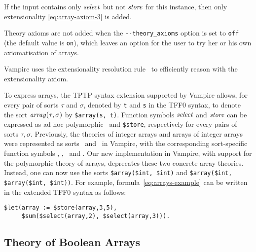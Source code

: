 If the input contains only $\mathit{select}$ but not $\mathit{store}$ for this instance, then only extensionality \eqref{eq:array-axiom-3} is added.

Theory axioms are not added when the \verb'--theory_axioms' option is set to \verb'off' (the default value is \verb'on'), which leaves an option for the user to try her or his own axiomatisation of arrays.

Vampire uses the extensionality resolution rule~\cite{ATVA14} to efficiently reason with the extensionality axiom.

To express arrays, the TPTP syntax extension supported by Vampire
allows, for every pair of sorts $\tau$ and $\sigma$, denoted by
\lstinline't' and \lstinline's' in the TFF0 syntax, to denote the sort
$\mathit{array}(\tau,\sigma)$ by \lstinline'$array(s, t)'. Function symbols $\mathit{select}$
and $\mathit{store}$ can be expressed as ad-hoc polymorphic \dselect\ and
\texttt{\$store}, respectively for every pairs of sorts
$\tau,\sigma$. Previously,
the theories of integer arrays and arrays of integer arrays were
represented as sorts \darrayone\ and \darraytwo\ in Vampire,
with the corresponding sort-specific function symbols \dselectone, \dselecttwo, \dstoreone\  and
\dstoretwo. Our new implementation in Vampire, with
support for the polymorphic theory of arrays, deprecates these
two concrete array theories. Instead, one can now use the sorts
\lstinline'$array($int, $int)' and \lstinline'$array($int, $array($int, $int))'.
For example, formula~\eqref{eq:arrays-example} can be written in the extended TFF0 syntax as follows:
\begin{lstlisting}
$let(array := $store(array,3,5),
     $sum($select(array,2), $select(array,3))).
\end{lstlisting}%

\subsection{Theory of Boolean Arrays}

